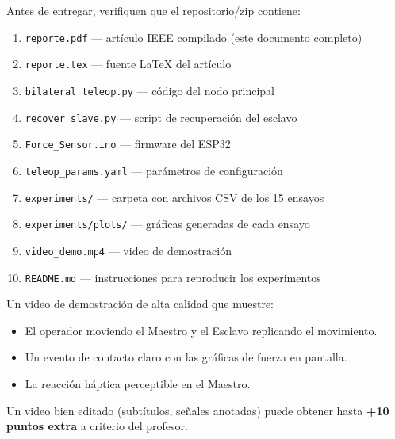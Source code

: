 \documentclass[journal,10pt,twoside]{IEEEtran}
\begin{document}
\begin{todobox}
  Antes de entregar, verifiquen que el repositorio/zip contiene:
  \begin{enumerate}[label=$\square$, itemsep=0.3em]
    \item \texttt{reporte.pdf} — artículo IEEE compilado (este documento completo)
    \item \texttt{reporte.tex} — fuente LaTeX del artículo
    \item \texttt{bilateral\_teleop.py} — código del nodo principal
    \item \texttt{recover\_slave.py} — script de recuperación del esclavo
    \item \texttt{Force\_Sensor.ino} — firmware del ESP32
    \item \texttt{teleop\_params.yaml} — parámetros de configuración
    \item \texttt{experiments/} — carpeta con archivos CSV de los 15 ensayos
    \item \texttt{experiments/plots/} — gráficas generadas de cada ensayo
    \item \texttt{video\_demo.mp4} — video de demostración
    \item \texttt{README.md} — instrucciones para reproducir los experimentos
  \end{enumerate}
\end{todobox}

\begin{rubricbox}
  Un video de demostración de alta calidad que muestre:
  \begin{itemize}[itemsep=0.2em]
    \item El operador moviendo el Maestro y el Esclavo replicando el movimiento.
    \item Un evento de contacto claro con las gráficas de fuerza en pantalla.
    \item La reacción háptica perceptible en el Maestro.
  \end{itemize}
  Un video bien editado (subtítulos, señales anotadas) puede obtener
  hasta \textbf{+10 puntos extra} a criterio del profesor.
\end{rubricbox}
\end{document}
